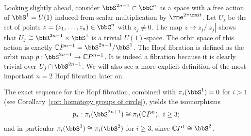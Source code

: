 \begin{defn}\label{def: Hopf fibrations}
    Looking slightly ahead, consider $\bbS^{2n-1}\subset \bbC^n$ as a space with a free action of $\bbS^1=U(1)$ induced from scalar multiplication by $\rme^{2\pi\rmi  t}$. Let $U_j$ be the set of points $z=(z_1,\ldots,z_n)\in\bbC^n$ with $z_j\neq 0$. The map $z\mapsto z_j/|z_j|$ shows that $U_j\cong \bbR^{2n-1}\times \bbS^1$ is a trivial $U(1)$-space. The orbit space of this action is exactly $\mathbb{C}P^{n-1}=\bbS^{2n-1}\slash \bbS^1$. The Hopf fibration is defined as the orbit map $p:\bbS^{2n-1}\to \mathbb{C}P^{n-1}$. It is indeed a fibration because it is clearly trivial over $U_j\cap \bbS^{2n-1}$. We will also see a more explicit definition of the most important $n=2$ Hopf fibration later on.
\end{defn}

\begin{example}
    The exact sequence for the Hopf fibration, combined with $\pi_i(\bbS^1)=0$ for $i>1$ (see Corollary~\ref{cor: homotopy groups of circle}), yields the isomorphisms
    \[p_\ast: \pi_i(\bbS^{2n+1})\cong \pi_i(\mathbb{C}P^n),\; i\geq 3;\]
    and in particular $\pi_i(\bbS^3)\cong \pi_i(\bbS^2)$ for $i\geq 3$, since $\mathbb{C}P^1\cong \bbS^2$.
\end{example}

